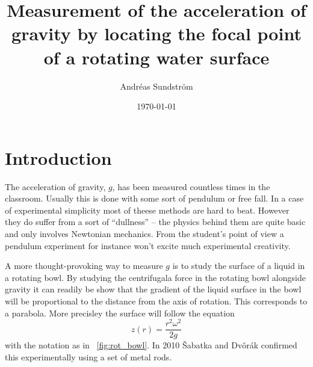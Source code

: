 \documentclass[11pt,towcolumn, swedish, english]{article}
\newcommand{\figref}{\figurename~\ref}
\begin{document}
\title{Measurement of the acceleration of gravity by locating the
  focal point of a rotating water surface} 

\author{Andréas Sundström \footnotemark 
}
\date{\today}




\section{Introduction}
The acceleration of gravity, $g$, has been measured countless times in the
classroom. Usually this is done with some sort of pendulum or free fall. In a
case of experimental simplicity most of theese methods are hard to beat. However
they do suffer from a sort of ``dullness'' -- the physics behind them are quite
basic and only involves Newtonian mechanics. From the student's point of view a
pendulum experiment for instance won't excite much experimental creativity. 

A more thought-provoking way to measure $g$ is to study the surface of a liquid
in a rotating bowl. By studying the centrifugala force in the rotating bowl
alongside gravity it can readily be show that the gradient of the liquid surface in
the bowl will be proportional to the distance from the axis of rotation. This
corresponds to a parabola. More precisley the surface will follow the
equation\cite{Sabatka2010, Berg1990} 
\begin{equation}\label{eq:parabola}
z(r)=\frac{r^2\omega^2}{2g}
\end{equation}
with the notation as in \figref{fig:rot_bowl}. In 2010 \v{S}abatka and
Dv\v{o}rák\cite{Sabatka2010} confirmed this experimentally using a set of metal
rods. 
\end{document}
